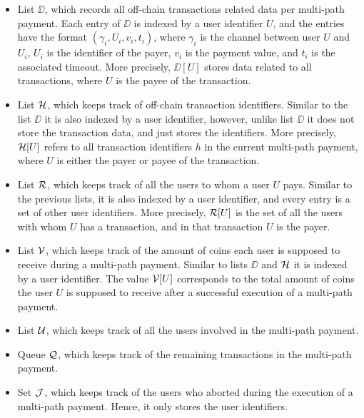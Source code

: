 \begin{itemize}
	\item List $\DD$, which records all off-chain transactions related data per multi-path 
	payment. Each entry of $\DD$ is indexed by a user identifier $U$, and the entries have the 
	format $(\gamma_i,U_i,v_i,t_i)$, where $\gamma_i$ is the channel between user $U$ and $U_i$, 
	$U_i$ is the identifier of the payer, $v_i$ is the payment value, and $t_i$ is the 
	associated timeout. More precisely, $\DD[U]$ stores data related to all transactions, 
	where $U$ is the payee of the transaction. 
	\item List $\mathcal{H}$, which keeps track of off-chain transaction identifiers. Similar to 
	the list $\DD$ it is also indexed by a user identifier, however, unlike list $\DD$ it 
	does not store the transaction data, and just stores the identifiers. More precisely, 
	$\mathcal{H}[U]$ refers to all transaction identifiers $h$ in the current multi-path payment, 
	where $U$ is either the payer or payee of the transaction.
	\item List $\mathcal{R}$, which keeps track of all the users to whom a user $U$ pays. Similar to 
	the previous lists, it is also indexed by a user identifier, and every entry is a set 
	of other user identifiers. More precisely, $\mathcal{R}[U]$ is the set of all the users with 
	whom $U$ has a transaction, and in that transaction $U$ is the payer.
	\item List $\mathcal{V}$, which keeps track of the amount of coins each user is supposed to 
	receive during a multi-path payment. Similar to lists $\DD$ and $\mathcal{H}$ it is indexed 
	by a user identifier. The value $\mathcal{V}[U]$ corresponds to the total amount of coins the 
	user $U$ is supposed to receive after a successful execution of a multi-path payment.
	\item List $\mathcal{U}$, which keeps track of all the users involved in the multi-path payment.
	\item Queue $\mathcal{Q}$, which keeps track of the remaining transactions in the multi-path payment.
	\item Set $\mathcal{J}$, which keeps track of the users who aborted during the execution of 
	a multi-path payment. Hence, it only stores the user identifiers.
\end{itemize}

